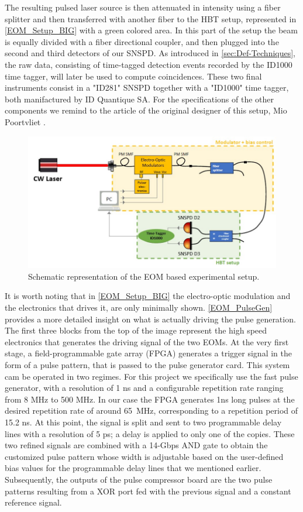 The resulting pulsed laser source is then attenuated in intensity using a fiber splitter and then transferred with another fiber to the HBT setup, represented in \autoref{EOM_Setup_BIG} with a green colored area.
In this part of the setup the beam is equally divided with a fiber directional coupler, and then plugged into the second and third detectors of our SNSPD. As introduced in \autoref{sec:Def-Techniques}, the raw data, consisting of time-tagged detection events recorded by the ID1000 time tagger, will later be used to compute coincidences. These two final instruments consist in a "ID281" SNSPD together with a "ID1000" time tagger, both manifactured by ID Quantique SA.
For the specifications of the other components we remind to the article of the original designer of this setup, Mio Poortvliet \cite{MioArticle}.

\begin{figure}[hbtp]
\centering
\includegraphics[width=1\textwidth]{EOMsetupBIG.jpg}
\caption{Schematic representation of the EOM based experimental setup. \cite{IlseThesis2023}}
\label{EOM_Setup_BIG}
\end{figure}
It is worth noting that in \autoref{EOM_Setup_BIG} the electro-optic modulation and the electronics that drives it, are only minimally shown. \autoref{EOM_PulseGen} provides a more detailed insight on what is actually driving the pulse generation.
The first three blocks from the top of the image represent the high speed electronics that generates the driving signal of the two EOMs.
At the very first stage, a field-programmable gate array (FPGA) generates a trigger signal in the form of a pulse pattern, that is passed to the pulse generator card. This system cam be operated in two regimes. For this project we specifically use the fast pulse generator, with a resolution of 1 ns and a configurable repetition rate ranging from 8 MHz to 500 MHz.
In our case the FPGA generates 1ns long pulses at the desired repetition rate of around 65~MHz, corresponding to a repetition period of 15.2 ns.  
At this point, the signal is split and sent to two programmable delay lines with a resolution of 5 ps; a delay is applied to only one of the copies.
These two refined signals are combined with a 14-Gbps AND gate to obtain the customized pulse pattern whose width is adjustable based on the user-defined bias values for the programmable delay lines that we mentioned earlier.
Subsequently, the outputs of the pulse compressor board are the two pulse patterns resulting from a XOR port fed with the previous signal and a constant reference signal.

